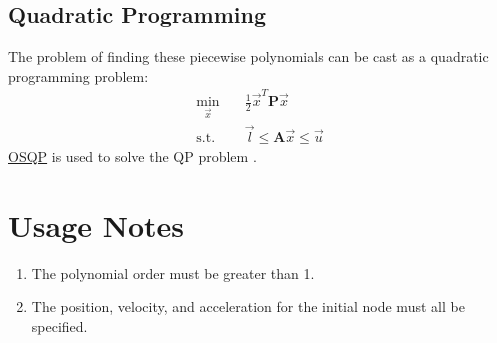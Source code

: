 \documentclass[12pt]{article}
\begin{document}
\subsection{Quadratic Programming}
The problem of finding these piecewise polynomials can be cast as a quadratic
programming problem:
%
\begin{equation}
  \begin{split}
    \min_{\vec{x}} \quad& \frac{1}{2} \vec{x}^T \mathbf{P} \vec{x}  \\
    \text{s.t.} \quad& \vec{l} \leq \mathbf{A} \vec{x} \leq \vec{u}
  \end{split}
\end{equation}
%
\href{https://osqp.org}{OSQP} is used to solve the QP problem \cite{osqp}.

\section{Usage Notes}
\begin{enumerate}
  \item The polynomial order must be greater than 1.
  \item The position, velocity, and acceleration for the initial node must all
    be specified. 
\end{enumerate}



\end{document}

